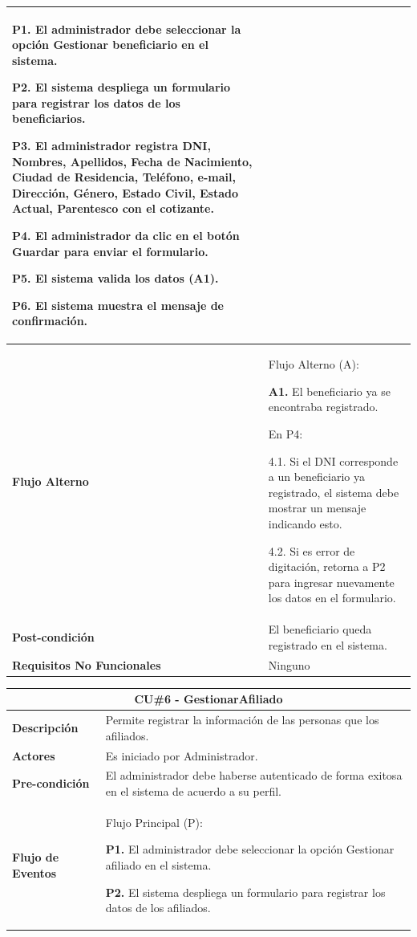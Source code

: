 \documentclass[12pt,a4paper]{article}
\begin{document}
\begin{center}
\begin{tabular}{|p{5.5cm}| p{9.5cm}|}
\textbf{P1.} El administrador debe seleccionar la opción Gestionar beneficiario en el sistema.

\textbf{P2.} El sistema despliega un formulario para registrar los datos de los beneficiarios.

\textbf{P3.} El administrador registra DNI, Nombres, Apellidos, Fecha de Nacimiento, Ciudad de Residencia, Teléfono, e-mail, Dirección, Género, Estado Civil, Estado Actual, Parentesco con el cotizante.

\textbf{P4.} El administrador da clic en el botón Guardar para enviar el formulario.

\textbf{P5.} El sistema valida los datos (A1).

\textbf{P6.} El sistema muestra el mensaje de confirmación.
\\
\hline 
\textbf{Flujo Alterno} &  Flujo Alterno (A):

\textbf{A1.} El beneficiario ya se encontraba registrado.

	En P4:
	
	4.1. Si el DNI corresponde a un beneficiario ya registrado, el sistema debe mostrar un mensaje indicando esto.
	
	4.2. Si es error de digitación, retorna a P2 para ingresar nuevamente los datos en el formulario. \\ 
\hline 
\textbf{Post-condición}  & El beneficiario queda registrado en el sistema. \\ 
\hline 
\textbf{Requisitos No Funcionales} & Ninguno \\ 
\hline 
\end{tabular}
\vspace{5mm}

\begin{tabular}{|p{5.5cm}| p{9.5cm}|}
\hline 
\multicolumn{2}{|c|}{\textbf{CU\#6 - GestionarAfiliado}} \\ 
\hline 
\textbf{Descripción} & Permite registrar la información de las personas que los afiliados. \\ 
\hline 
\textbf{Actores} & Es iniciado por Administrador. \\ 
\hline 
\textbf{Pre-condición} & El administrador debe haberse autenticado de forma exitosa en el sistema de acuerdo a su perfil. \\ 
\hline 
\textbf{Flujo de Eventos} & Flujo Principal (P):

\textbf{P1.} El administrador debe seleccionar la opción Gestionar afiliado en el sistema.

\textbf{P2.} El sistema despliega un formulario para registrar los datos de los afiliados.


\end{tabular}
\end{center}
\end{document}
